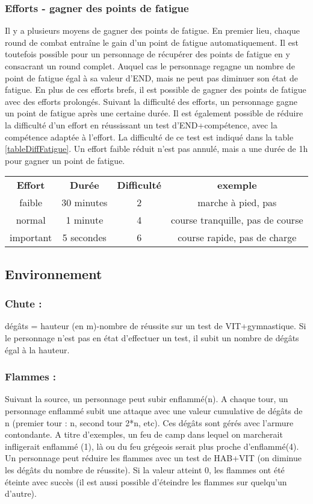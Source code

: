 \documentclass[10pt,a4paper,twocolumn]{book}
\begin{document}
\subsubsection{Efforts - gagner des points de fatigue}
Il y a plusieurs moyens de gagner des points de fatigue.
En premier lieu, chaque round de combat entraîne le gain d’un point de fatigue automatiquement. Il est toutefois possible pour un personnage de récupérer des points de fatigue en y consacrant un round complet. Auquel cas le personnage regagne un nombre de point de fatigue égal à sa valeur d’END, mais ne peut pas diminuer son état de fatigue.
En plus de ces efforts brefs, il est possible de gagner des points de fatigue avec des efforts prolongés.
Suivant la difficulté des efforts, un personnage gagne un point de fatigue après une certaine durée. Il est également possible de réduire la difficulté d’un effort en réussissant un test d’END+compétence, avec la compétence adaptée à l’effort. La difficulté de ce test est indiqué dans la table \ref{tableDiffFatigue}. Un effort faible réduit n’est pas annulé, mais a une durée de 1h pour gagner un point de fatigue.
\begin{table*}
\caption{ Réduire un effort :}
\label{tableDiffFatigue}
\begin{center}
\begin{tabular}{cccc}
\textbf{Effort} & \textbf{Durée} & \textbf{Difficulté} &\textbf{exemple} \\
   faible & 30 minutes & 2  & marche à pied, pas\\
   normal & 1 minute & 4  & course tranquille, pas de course\\
   important & 5 secondes & 6 & course rapide, pas de charge\\
\end{tabular}
\end{center}
\end{table*}

\subsection{Environnement}
\subsubsection{Chute :}
dégâts = hauteur (en m)-nombre de réussite sur un test de VIT+gymnastique. Si le personnage n’est pas en état d’effectuer un test, il subit un nombre de dégâts égal à la hauteur.
\subsubsection{Flammes :}
Suivant la source, un personnage peut subir enflammé(n). A chaque tour, un personnage enflammé subit une attaque avec une valeur cumulative de dégâts de n (premier tour : n, second tour 2*n, etc). Ces dégâts sont gérés avec l’armure contondante.
A titre d’exemples, un feu de camp dans lequel on marcherait infligerait enflammé (1), là ou du feu grégeois serait plus proche d’enflammé(4).
Un personnage peut réduire les flammes avec un test de HAB+VIT (on diminue les dégâts du nombre de réussite). Si la valeur atteint 0, les flammes ont été éteinte avec succès (il est aussi possible d’éteindre les flammes sur quelqu’un d’autre).
\end{document}

